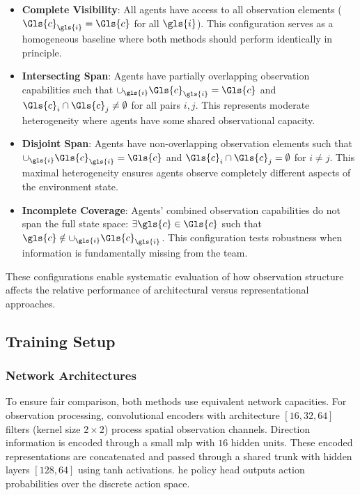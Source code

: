 \begin{itemize}
    \item \textbf{Complete Visibility}: 
        All agents have access to all observation elements 
        (\(\Gls{c}_{\gls{i}} = \Gls{c}\) for all \(\gls{i}\)). 
        This configuration serves as a homogeneous baseline 
        where both methods should perform identically in principle.
        \item \textbf{Intersecting Span}: 
        Agents have partially overlapping observation capabilities such that 
        \(\cup_{\gls{i}} \Gls{c}_{\gls{i}} = \Gls{c}\) and 
        \(\Gls{c}_i \cap \Gls{c}_j \neq \emptyset\) for all pairs \(i,j\). 
        This represents moderate heterogeneity where agents have some 
        shared observational capacity.
        \item \textbf{Disjoint Span}: 
        Agents have non-overlapping observation elements such that 
        \(\cup_{\gls{i}} \Gls{c}_{\gls{i}} = \Gls{c}\) and
        \(\Gls{c}_i \cap \Gls{c}_j = \emptyset\) for \(i \neq j\).
        This maximal heterogeneity ensures agents observe completely different 
        aspects of the environment state.
        \item \textbf{Incomplete Coverage}: 
        Agents' combined observation capabilities do not span the full state space: 
        \(\exists \gls{c}\in\Gls{c}\) such that 
        \(\gls{c} \notin \cup_{\gls{i}} \Gls{c}_{\gls{i}}\). 
        This configuration tests robustness when information is 
        fundamentally missing from the team.
\end{itemize}

These configurations enable systematic evaluation of how observation structure 
affects the relative performance of architectural versus representational approaches.

\subsection{Training Setup}

\subsubsection{Network Architectures}

To ensure fair comparison, both methods use equivalent network capacities. 
For observation processing, convolutional encoders with architecture 
\([16, 32, 64]\) filters (kernel size \(2 \times 2\)) process spatial observation channels. 
Direction information is encoded through a small \gls{mlp} with \(16\) hidden units. 
These encoded representations are concatenated and passed through a shared trunk with 
hidden layers \([128, 64]\) using tanh activations. 
he policy head outputs action probabilities over the discrete action space.

